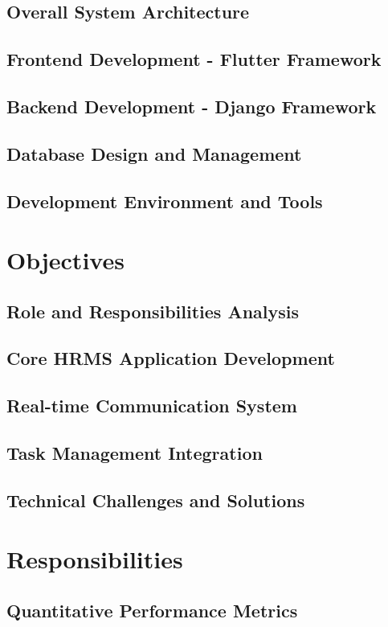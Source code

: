 \documentclass[a4paper, 11pt, oneside]{report}
\begin{document}
  \section{Overall System Architecture}
  \section{Frontend Development - Flutter Framework}
  \section{Backend Development - Django Framework}
  \section{Database Design and Management}
  \section{Development Environment and Tools}
  

\chapter{Objectives}
  \section{Role and Responsibilities Analysis}
  \section{Core HRMS Application Development}
  \section{Real-time Communication System}
  \section{Task Management Integration}
  \section{Technical Challenges and Solutions}
  

\chapter{Responsibilities}
  \section{Quantitative Performance Metrics}
\end{document}
